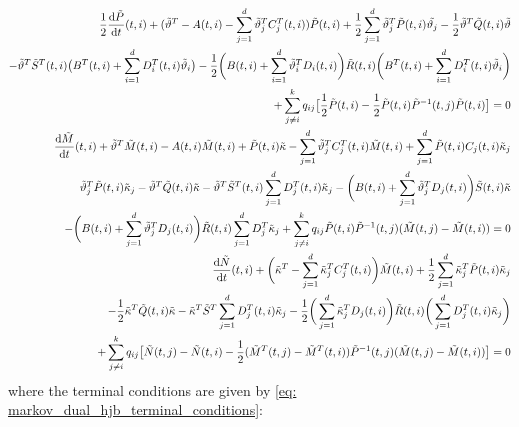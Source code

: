 \begin{align*}
     \frac12 \frac{\mathop{}\!\mathrm{d} \Tilde{P}}{\mathop{}\!\mathrm{d} t}(t,i) + (\Tilde{\vartheta}^T - A(t,i) - \sum_{j=1}^d \Tilde{\vartheta}_j^T C_j^T(t,i))\Tilde{P}(t,i) + \frac12 \sum_{j=1}^d \Tilde{\vartheta}_j^T \Tilde{P}(t,i) \Tilde{\vartheta_j} - \frac12 \tilde{\vartheta}^T \tilde{Q}(t,i)\tilde{\vartheta}\\
    - \tilde{\vartheta}^T \tilde{S}^T(t,i) \big(B^T(t,i) + \sum_{i=1}^d D_i^T(t,i) \tilde{\vartheta}_i \big)
    - \frac12 \bigg(B(t,i) + \sum_{i=1}^d\tilde{\vartheta}_i^T D_i(t,i)\bigg) \tilde{R}(t,i) \bigg(B^T(t,i) + \sum_{i=1}^d D_i^T(t,i) \tilde{\vartheta}_i\bigg)\\
    + \sum_{j\ne i}^k q_{ij}  \big[\frac12 \Tilde{P}(t,i) - \frac12 \Tilde{P}(t,i)\Tilde{P}^{-1}(t,j)\Tilde{P}(t,i)\big] = 0 \\
    \frac{\mathop{}\!\mathrm{d} \Tilde{M}}{\mathop{}\!\mathrm{d} t}(t,i) + \Tilde{\vartheta}^T \Tilde{M}(t,i) - A(t,i) \Tilde{M}(t,i) + \Tilde{P}(t,i) \Tilde{\kappa} - \sum_{j=1}^d \Tilde{\vartheta}_j^T C_j^T(t,i) \Tilde{M}(t,i) + \sum_{j=1}^d \Tilde{P}(t,i) C_j(t,i) \Tilde{\kappa}_j\\
    \Tilde{\vartheta}_j^T \Tilde{P}(t,i) \Tilde{\kappa}_j - \tilde{\vartheta}^T \Tilde{Q}(t,i) \Tilde{\kappa} - \Tilde{\vartheta}^T \Tilde{S}^T(t,i) \sum_{j=1}^d D_j^T(t,i) \Tilde{\kappa}_j - \bigg(B(t,i) + \sum_{j=1}^d \Tilde{\vartheta}_j^T D_j(t,i)\bigg)\Tilde{S}(t,i) \Tilde{\kappa}\\
    - \bigg( B(t,i) + \sum_{j=1}^d \Tilde{\vartheta}_j^T D_j(t,i) \bigg) \Tilde{R}(t,i) \sum_{j=1}^d D_j^T \Tilde{\kappa}_j +\sum_{j\ne i}^k q_{ij} \Tilde{P}(t,i) \Tilde{P}^{-1}(t,j) (\Tilde{M}(t,j) - \Tilde{M}(t,i)) = 0 \\
    \frac{\mathop{}\!\mathrm{d} \Tilde{N}}{\mathop{}\!\mathrm{d} t}(t,i) + \bigg(\Tilde{\kappa}^T - \sum_{j=1}^d \Tilde{\kappa}_j^T C_j^T(t,i)\bigg) \Tilde{M}(t,i) + \frac12 \sum_{j=1}^d \Tilde{\kappa}^T_j \Tilde{P}(t,i) \Tilde{\kappa}_j \\
    - \frac12 \Tilde{\kappa}^T \Tilde{Q}(t,i) \Tilde{\kappa} - \Tilde{\kappa}^T \Tilde{S}^T \sum_{j=1}^d D_j^T(t,i) \Tilde{\kappa}_j - \frac12 \bigg(\sum_{j=1}^d \Tilde{\kappa}_j^T D_j(t,i)\bigg) \Tilde{R}(t,i) \bigg( \sum_{j=1}^d D_j^T(t,i) \Tilde{\kappa}_j\bigg)\\
    + \sum_{j\ne i}^k q_{ij} \big[ \Tilde{N}(t,j) - \Tilde{N}(t,i) - \frac12 (\Tilde{M}^T(t,j) - \Tilde{M}^T(t,i)) \Tilde{P}^{-1}(t,j)(\Tilde{M}(t,j) - \Tilde{M}(t,i)) \big] = 0 
\end{align*}
where the terminal conditions are given by \eqref{eq: markov_dual_hjb_terminal_conditions}:
